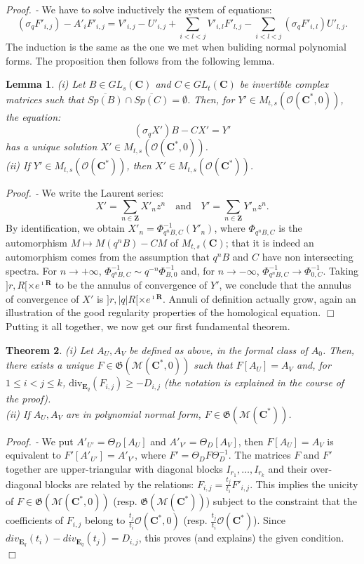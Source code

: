 \documentclass[english]{smfart}
\newtheorem{thm}{Theorem}[section]
\newtheorem{lemma}[thm]{Lemma}
\numberwithin{equation}{thm}
\def \Pr {\textsl{Proof. - }}
\def\sq{\sigma_q}
\def\C{{\mathbf C}}
\def\Z{{\mathbf Z}}
\def\R{{\mathbf R}}
\def\Eq{{\mathbf{E}_{q}}}
\def\G{{\mathfrak{G}}}
\def\Rw{{\mathcal{O}(\C^{*})}}
\def\Kw{{\mathcal{M}(\C^{*})}}
\def\Rwg{{\mathcal{O}(\C^{*},0)}}
\def\Kwg{{\mathcal{M}(\C^{*},0)}}
\def\l{\left}
\def\r{\right}
\def\Th{\Theta}
\def\div{\text{div}}
\begin{document}
\Pr 
We have to solve inductively the system of equations:
$$
\l(\sq F'_{i,j}\r) - A'_{i} F'_{i,j} =
V'_{i,j} - U'_{i,j} +
\sum_{i < l < j} V'_{i,l} F'_{l,j} - 
\sum_{i < l < j} \l(\sq F'_{i,l}\r) U'_{l,j}.
$$
The induction is the same as the one we met when buliding
normal polynomial forms. The proposition then 
follows from the following lemma.

\begin{lemma}
(i) Let $B \in GL_{s}(\C)$ and $C \in GL_{t}(\C)$ be invertible
complex matrices such that 
$\overline{Sp(B)} \cap \overline{Sp(C)} = \emptyset$.
Then, for $Y' \in M_{t,s}(\Rwg)$, the equation:
$$
\l(\sq X'\r) B - C X' = Y'
$$
has a unique solution $X' \in M_{t,s}(\Rwg)$. \\
(ii) If $Y' \in M_{t,s}(\Rw)$, then $X' \in M_{t,s}(\Rw)$.
\end{lemma}

\Pr 
We write the Laurent series:
$$
X' = \sum_{n \in \Z} X'_{n} z^{n} \quad \text{and} \quad
Y' = \sum_{n \in \Z} Y'_{n} z^{n}.
$$
By identification, we obtain $X'_{n} = \Phi_{q^{n} B,C}^{-1}(Y'_{n})$,
where $\Phi_{q^{n} B,C}$ is the automorphism $M \mapsto M (q^{n} B) - C M$ 
of $M_{t,s}(\C)$; that it is indeed an automorphism comes from the
assumption that $q^{n} B$ and $C$ have non intersecting spectra.
For $n \to + \infty$, 
$\Phi_{q^{n} B,C}^{-1} \sim q^{-n} \Phi_{B,0}^{-1}$
and, for 
$n \to - \infty$, $\Phi_{q^{n} B,C}^{-1} \to \Phi_{0,C}^{-1}$.
Taking $]r,R[ \times e^{\imath \R}$ to be the annulus of convergence
of $Y'$, we conclude that the annulus of convergence of $X'$ is 
$]r,|q| R[ \times e^{\imath \R}$.
Annuli of definition actually grow, again an illustration of the
good regularity properties of the homological equation.
\hfill $\Box$ \\

Putting it all together, we now get our first fundamental theorem.

\begin{thm} \label{thm:resommation-algebrique}
(i) Let $A_{U},A_{V}$ be defined as above, in the formal class of $A_{0}$.
Then, there exists a unique $F \in \G(\Kwg)$ such that $F[A_{U}] = A_{V}$ 
and, for $1 \leq i < j \leq k$, $\div_{\Eq}(F_{i,j}) \geq - D_{i,j}$
(the notation is explained in the course of the proof). \\
(ii) If $A_{U},A_{V}$ are in polynomial normal form, $F \in \G(\Kw)$.
\end{thm}

\Pr 
We put $A'_{U'} = \Th_{D}[A_{U}]$ and $A'_{V'} = \Th_{D}[A_{V}]$,
then $F[A_{U}] = A_{V}$ is equivalent to $F'[A'_{U'}] = A'_{V'}$,
where $F' = \Th_{D} F \Th_{D}^{-1}$. The matrices $F$ and $F'$
together are upper-triangular with diagonal blocks 
$I_{r_{1}},\ldots,I_{r_{k}}$ and their over-diagonal blocks
are related by the relations: $F_{i,j} = \frac{t_{j}}{t_{i}}F'_{i,j}$.
This implies the unicity of $F \in \G(\Kwg)$ (resp. $\G(\Kw)$)
subject to the constraint that the coefficients of $F_{i,j}$ belong 
to $\frac{t_{j}}{t_{i}} \Rwg$ (resp. $\frac{t_{j}}{t_{i}} \Rw$). 
Since $div_{\Eq}(t_{i}) - div_{\Eq}(t_{j}) = D_{i,j}$, this proves
(and explains) the given condition. 
\hfill $\Box$ \\
\end{document}
